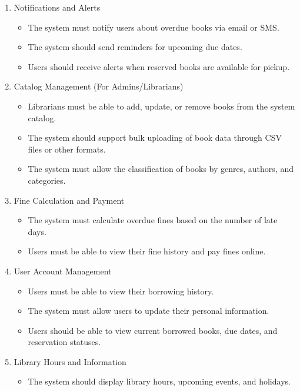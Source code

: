 \documentclass[a4paper]{article}
\begin{document}
\begin{enumerate}[(1)]
        \item Notifications and Alerts  
            \begin{itemize}
                \item  The system must notify users about overdue books via email or SMS.
                \item  The system should send reminders for upcoming due dates. 
                \item  Users should receive alerts when reserved books are available for pickup.
            \end{itemize}
        \item Catalog Management (For Admins/Librarians)  
            \begin{itemize}
                \item  Librarians must be able to add, update, or remove books from the system catalog.
                \item  The system should support bulk uploading of book data through CSV files or other formats.
                \item  The system must allow the classification of books by genres, authors, and categories.
            \end{itemize}
        \item Fine Calculation and Payment 
            \begin{itemize}
                \item  The system must calculate overdue fines based on the number of late days.
                \item  Users must be able to view their fine history and pay fines online.
            \end{itemize}
        \item User Account Management   
            \begin{itemize}
                \item  Users must be able to view their borrowing history.
                \item  The system must allow users to update their personal information.
                \item  Users should be able to view current borrowed books, due dates, and reservation statuses.
            \end{itemize}
        \item Library Hours and Information  
            \begin{itemize}
                \item  The system should display library hours, upcoming events, and holidays.

\end{itemize}
\end{enumerate}
\end{document}
